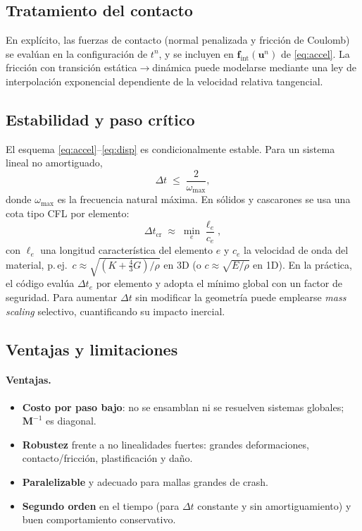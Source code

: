 \documentclass[11pt]{article} %
\begin{document}
\subsection{Tratamiento del contacto}
En explícito, las fuerzas de contacto (normal penalizada y fricción de Coulomb) se evalúan en la configuración de $t^n$, y se incluyen en $\mathbf{f}_{\mathrm{int}}(\mathbf{u}^n)$ de \eqref{eq:accel}. La fricción con transición estática$\to$dinámica puede modelarse mediante una ley de interpolación exponencial dependiente de la velocidad relativa tangencial.

\subsection{Estabilidad y paso crítico}
El esquema \eqref{eq:accel}--\eqref{eq:disp} es condicionalmente estable. Para un sistema lineal no amortiguado,
\begin{equation}
  \Delta t \;\le\; \frac{2}{\omega_{\max}},
\end{equation}
donde $\omega_{\max}$ es la frecuencia natural máxima. En sólidos y cascarones se usa una cota tipo CFL por elemento:
\begin{equation}
  \Delta t_{\mathrm{cr}} \;\approx\; \min_{e}\frac{\ell_e}{c_e},
\end{equation}
con $\ell_e$ una longitud característica del elemento $e$ y $c_e$ la velocidad de onda del material, p.\,ej.\ $c \approx \sqrt{(K+\frac{4}{3}G)/\rho}$ en 3D (o $c\approx\sqrt{E/\rho}$ en 1D). En la práctica, el código evalúa $\Delta t_e$ por elemento y adopta el mínimo global con un factor de seguridad. Para aumentar $\Delta t$ sin modificar la geometría puede emplearse \emph{mass scaling} selectivo, cuantificando su impacto inercial.

\subsection{Ventajas y limitaciones}
\paragraph{Ventajas.}
\begin{itemize}
  \item \textbf{Costo por paso bajo}: no se ensamblan ni se resuelven sistemas globales; $\mathbf{M}^{-1}$ es diagonal.
  \item \textbf{Robustez} frente a no linealidades fuertes: grandes deformaciones, contacto/fricción, plastificación y daño.
  \item \textbf{Paralelizable} y adecuado para mallas grandes de crash.
  \item \textbf{Segundo orden} en el tiempo (para $\Delta t$ constante y sin amortiguamiento) y buen comportamiento conservativo.
\end{itemize}
\end{document}

